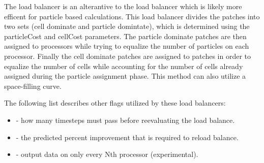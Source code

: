 The  load balancer is an alterantive to the  load balancer which is
likely more efficent for particle based calculations.  This load balancer
divides the patches into two sets (cell dominate and particle domintate), 
which is determined using the particleCost and cellCost parameters.
The particle dominate patches are then assigned to processors while trying
to equalize the number of particles on each processor.  Finally the 
cell dominate patches are assigned to patches in order to equalize the number
of cells while accounting for the number of cells already assigned during 
the particle assignment phase.  This method can also utilize a space-filling
curve.  

The following list describes other flags utilized by these load balancers:
\begin{itemize}
  \item {} - how many timesteps must pass before reevaluating the load balance.  
  \item {} - the predicted percent improvement that is required to reload balance.  
  \item {} - output data on only every Nth processor (experimental). 
\end{itemize}

